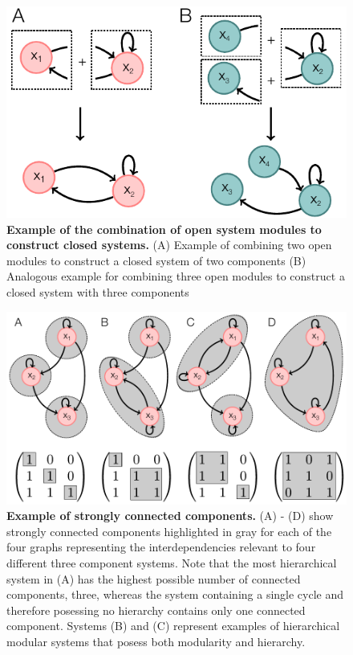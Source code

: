 \begin{figure}[!ht]
\centering
\noindent\includegraphics[width=0.6\columnwidth]{fig/examplesystemmodules.pdf}
\caption{{\bf Example of the combination of open system modules to construct closed systems.} (A) Example of combining two open modules to construct a closed system of two components (B) Analogous example for combining three open modules to construct a closed system with three components}
\label{fig:examplesystemmodules}
\end{figure}

\begin{figure}[!ht]
\centering
\noindent\includegraphics[width=0.7\columnwidth]{fig/scc.pdf}
\caption{{\bf Example of strongly connected components.} (A) - (D) show strongly connected components highlighted in gray for each of the four graphs representing the interdependencies relevant to four different three component systems. Note that the most hierarchical system in (A) has the highest possible number of connected components, three, whereas the system containing a single cycle and therefore posessing no hierarchy contains only one connected component. Systems (B) and (C) represent examples of hierarchical modular systems that posess both modularity and hierarchy.}
\label{fig:scc}
\end{figure}

